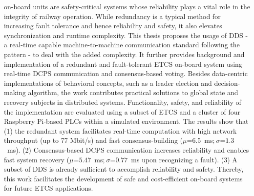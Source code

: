 
\null\vfil
\begin{center}\textsf{\textbf{\abstractname}}\end{center}
%
\noindent {} on-board units are safety-critical systems whose reliability plays a vital role in the integrity of railway operation.
While redundancy is a typical method for increasing fault tolerance and hence reliability and safety, it also elevates synchronization and runtime complexity.
This thesis proposes the usage of DDS - a real-time capable machine-to-machine communication standard following the  pattern - to deal with the added complexity.
It further provides background and implementation of a redundant and fault-tolerant ETCS on-board system using real-time DCPS communication and consensus-based voting.
Besides data-centric implementations of behavioral concepts, such as a leader election and decision-making algorithm, the work contributes practical solutions to global state and recovery subjects in distributed systems.
Functionality, safety, and reliability of the implementation are evaluated using a subset of ETCS and a cluster of four Raspberry Pi-based PLCs within a simulated environment.
The results show that (1) the redundant system facilitates real-time computation with high network throughput (up to 77 Mbit/s) and fast consensus-building ($\mu$=$6.5$~ms;$~\sigma$=$1.3$~ms). (2) Consensus-based DCPS communication increases reliability and enables fast system recovery ($\mu$=$5.47$~ms;$~\sigma$=$0.77$~ms upon recognizing a fault). (3) A subset of DDS is already sufficient to accomplish reliability and safety.
Thereby, this work facilitates the development of safe and cost-efficient on-board systems for future ETCS applications.

\vfil\null
\clearpage

